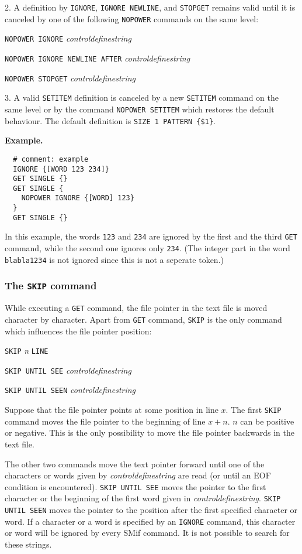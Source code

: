 \documentclass{article}
\begin{document}
2. A definition by \texttt{IGNORE}, \texttt{IGNORE NEWLINE}, and
\texttt{STOPGET} remains valid until it is canceled by one of the
following \texttt{NOPOWER} commands on the same level:

\texttt{NOPOWER IGNORE} \emph{controldefinestring}

\texttt{NOPOWER IGNORE NEWLINE AFTER} \emph{controldefinestring}

\texttt{NOPOWER STOPGET} \emph{controldefinestring}

3. A valid \texttt{SETITEM} definition is canceled by a new
\texttt{SETITEM} command on the same level or by the command
\texttt{NOPOWER SETITEM} which restores the default behaviour.  The
default definition is \texttt{SIZE 1 PATTERN \{\$1\}}.

\textbf{Example.}

\begin{verbatim}
  # comment: example
  IGNORE {[WORD 123 234]}
  GET SINGLE {}
  GET SINGLE {
    NOPOWER IGNORE {[WORD] 123}
  }
  GET SINGLE {}
\end{verbatim}
In this example, the words \texttt{123} and \texttt{234} are ignored
by the first and the third \texttt{GET} command, while the second one
ignores only \texttt{234}. (The integer part in the word
\texttt{blabla1234} is not ignored since this is not a seperate
token.)

\subsubsection{The \texttt{SKIP} command}

While executing a \texttt{GET} command, the file pointer in the text
file is moved character by character. Apart from \texttt{GET} command,
\texttt{SKIP} is the only command which influences the file pointer
position:

\texttt{SKIP} \emph{n} \texttt{LINE}

\texttt{SKIP UNTIL SEE} \emph{controldefinestring}

\texttt{SKIP UNTIL SEEN} \emph{controldefinestring}

Suppose that the file pointer points at some position in line $x$.
The first \texttt{SKIP} command moves the file pointer to the
beginning of line $x + n$. $n$ can be positive or negative. This is
the only possibility to move the file pointer backwards in the text
file.

The other two commands move the text pointer forward until one of the
characters or words given by \emph{controldefinestring} are read (or
until an EOF condition is encountered).  \texttt{SKIP UNTIL SEE} moves
the pointer to the first character or the beginning of the first word
given in \emph{controldefinestring}.  \texttt{SKIP UNTIL SEEN} moves
the pointer to the position after the first specified character or
word. If a character or a word is specified by an \texttt{IGNORE}
command, this character or word will be ignored by every SMif command.
It is not possible to search for these strings.
\end{document}
